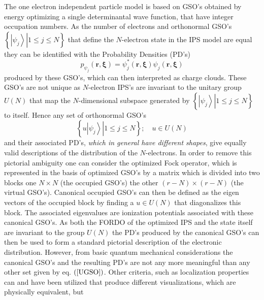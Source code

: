 \documentclass[aps,preprint]{revtex4}%
\begin{document}
The one electron independent particle model is based on GSO's obtained by
energy optimizing a single determinantal wave function, that have integer
occupation numbers. As the number of electrons and orthonormal GSO's $\left\{
\left.  \left\vert \psi_{j}\right\rangle \right\vert 1\leq j\leq N\right\}  $
that define the $N$-electron state in the IPS model are equal they can be
identified with the Probability Densities (PD's)
\begin{equation}
p_{\psi_{j}}\left(  \boldsymbol{r},\boldsymbol{\xi}\right)  =\psi_{j}^{\ast
}\left(  \boldsymbol{r},\boldsymbol{\xi}\right)  \psi_{j}\left(
\boldsymbol{r},\boldsymbol{\xi}\right)  \label{PD}%
\end{equation}
produced by these GSO's, which can then interpreted as charge clouds. These
GSO's are not unique as $N$-electron IPS's are invariant to the unitary group
$U\left(  N\right)  $ that map the $N$-dimensional subspace generated by
$\left\{  \left.  \left\vert \psi_{j}\right\rangle \right\vert 1\leq j\leq
N\right\}  $ to itself. Hence any set of orthonormal GSO's
\begin{equation}
\left\{  \left.  u\left\vert \psi_{j}\right\rangle \right\vert 1\leq j\leq
N\right\}  ;\quad u\in U\left(  N\right)  \label{UGSO}%
\end{equation}
and their associated PD's, \emph{which in general have different shapes}, give
equally valid descriptions of the distribution of the $N$-electrons. In order
to remove this pictorial ambiguity one can consider the optimized Fock
operator, which is represented in the basis of optimized GSO's by a matrix
which is divided into two blocks one $N\times N$ (the occupied GSO's) the
other $\left(  r-N\right)  \times\left(  r-N\right)  $ (the virtual GSO's).
Canonical occupied GSO's can then be defined as the eigen vectors of the
occupied block by finding a $u\in U\left(  N\right)  $ that diagonalizes this
block. The associated eigenvalues are ionization potentials associated with
these canonical GSO's. As both the FORDO of the optimized IPS and the state
itself are invariant to the group $U\left(  N\right)  $ the PD's produced by
the canonical GSO's can then be used to form a standard pictorial description
of the electronic distribution. However, from basic quantum mechanical
considerations the canonical GSO's and the resulting PD's are not any more
meaningful than any other set given by eq. $\left(  \ref{UGSO}\right)  $.
Other criteria, such as localization properties can and have been utilized
that produce different visualizations, which are physically equivalent, but
\end{document}
